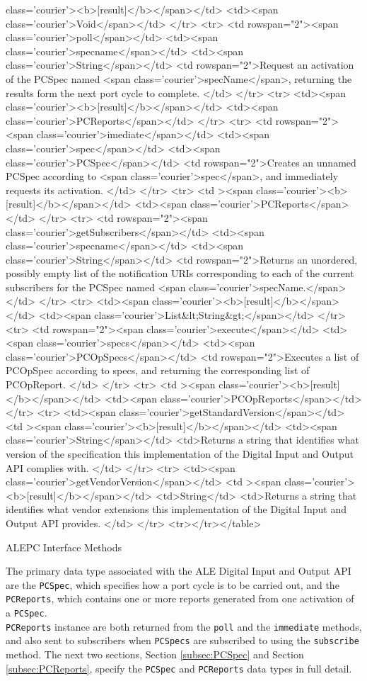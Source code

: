 \documentclass[11pt,a4paper,oneside]{article}
\begin{document}
\begin{table}
{class='courier'><b>[result]</b></span></td> <td><span class='courier'>Void</span></td> </tr> <tr> <td rowspan="2"><span class='courier'>poll</span></td> <td><span class='courier'>specname</span></td> <td><span class='courier'>String</span></td> <td rowspan="2">Request an activation of the PCSpec named <span class='courier'>specName</span>, returning the results form the next port cycle to complete. </td> </tr> <tr> <td><span class='courier'><b>[result]</b></span></td> <td><span class='courier'>PCReports</span></td> </tr> <tr> <td rowspan="2"><span class='courier'>imediate</span></td> <td><span class='courier'>spec</span></td> <td><span class='courier'>PCSpec</span></td> <td rowspan="2">Creates an unnamed PCSpec according to <span class='courier'>spec</span>, and immediately requests its activation. </td> </tr> <tr> <td ><span class='courier'><b>[result]</b></span></td> <td><span class='courier'>PCReports</span></td> </tr> <tr> <td rowspan="2"><span class='courier'>getSubscribers</span></td> <td><span class='courier'>specname</span></td> <td><span class='courier'>String</span></td> <td rowspan="2">Returns an unordered, possibly empty list of the notification URIs corresponding to each of the current subscribers for the PCSpec named <span class='courier'>specName.</span> </td> </tr> <tr> <td><span class='courier'><b>[result]</b></span></td> <td><span class='courier'>List&lt;String&gt;</span></td> </tr> <tr> <td rowspan="2"><span class='courier'>execute</span></td> <td><span class='courier'>specs</span></td> <td><span class='courier'>PCOpSpecs</span></td> <td rowspan="2">Executes a list of PCOpSpec according to specs, and returning the corresponding list of PCOpReport. </td> </tr> <tr> <td ><span class='courier'><b>[result]</b></span></td> <td><span class='courier'>PCOpReports</span></td> </tr> <tr> <td><span class='courier'>getStandardVersion</span></td> <td ><span class='courier'><b>[result]</b></span></td> <td><span class='courier'>String</span></td> <td>Returns a string that identifies what version of the specification this implementation of the Digital Input and Output API complies with. </td> </tr> <tr> <td><span class='courier'>getVendorVersion</span></td> <td ><span class='courier'><b>[result]</b></span></td> <td>String</td> <td>Returns a string that identifies what vendor extensions this implementation of the Digital Input and Output API provides. </td> </tr> <tr></tr></table>}
\caption{ALEPC Interface Methods}
\end{table}
\fi

The primary data type associated with the ALE Digital Input and Output API are the \texttt{PCSpec}, which specifies how a port cycle is to be carried out, and the\texttt{ PCReports}, which contains one or more reports generated from one activation of a \texttt{PCSpec}. \\
\texttt{PCReports} instance are both returned from the \texttt{poll} and the \texttt{immediate} methods, and also sent to subscribers when \texttt{PCSpecs} are subscribed to using the \texttt{subscribe} method. The next two sections, Section \ref{subsec:PCSpec} and Section \ref{subsec:PCReports}, specify the \texttt{PCSpec} and \texttt{PCReports} data types in full detail.
\end{document}
